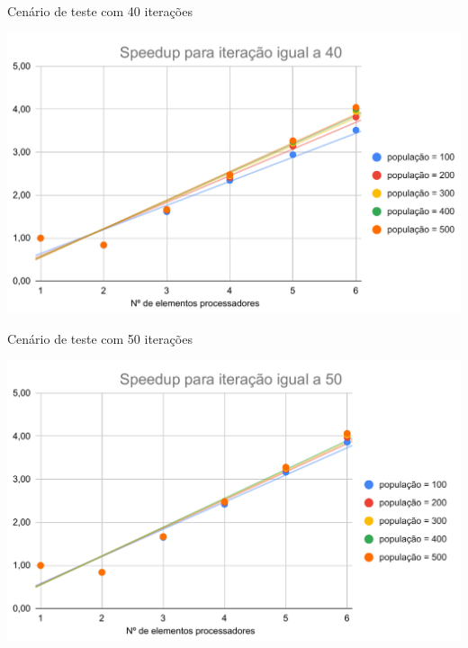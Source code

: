 \begin{graph}[h]{16cm}
    \caption{Cenário de teste com 40 iterações}
    \label{cenario11a15}
        \includegraphics[width=14cm]{graficos/Speedup para iteração igual a 40.pdf}
\end{graph}

\begin{graph}[h]{16cm}
    \caption{Cenário de teste com 50 iterações}
    \label{cenario16a20}
    \includegraphics[width=14cm]{graficos/Speedup para iteração igual a 50.pdf}
\end{graph}

